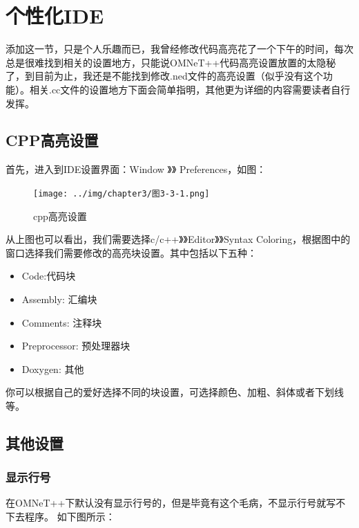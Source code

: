 \section{个性化IDE}
\label{个性化ide}

添加这一节，只是个人乐趣而已，我曾经修改代码高亮花了一个下午的时间，每次总是很难找到相关的设置地方，只能说OMNeT++代码高亮设置放置的太隐秘了，到目前为止，我还是不能找到修改.ned文件的高亮设置（似乎没有这个功能）。相关.cc文件的设置地方下面会简单指明，其他更为详细的内容需要读者自行发挥。

\subsection{CPP高亮设置}
\label{cpp高亮设置}

首先，进入到IDE设置界面：Window 》》 Preferences，如图：

\begin{figure}[htbp]
\centering
\texttt{[image: ../img/chapter3/图3-3-1.png]}
\caption{cpp高亮设置}
\end{figure}

从上图也可以看出，我们需要选择c\slash c++》》Editor》》Syntax Coloring，根据图中的窗口选择我们需要修改的高亮块设置。其中包括以下五种：

\begin{itemize}
\item Code:代码块

\item Assembly: 汇编块

\item Comments: 注释块

\item Preprocessor: 预处理器块

\item Doxygen: 其他

\end{itemize}

你可以根据自己的爱好选择不同的块设置，可选择颜色、加粗、斜体或者下划线等。

\subsection{其他设置}
\label{其他设置}

\subsubsection{显示行号}
\label{显示行号}

在OMNeT++下默认没有显示行号的，但是毕竟有这个毛病，不显示行号就写不下去程序。
如下图所示：

